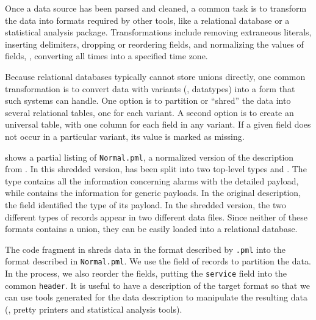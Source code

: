 Once a data source has been parsed and cleaned, a common task is to
transform the data into formats required by other tools, like a
relational database or a statistical analysis package.
Transformations include removing extraneous literals, inserting
delimiters, dropping or reordering fields, and normalizing the values
of fields, \eg{}, converting all times into a specified time zone.

Because relational databases typically cannot store unions directly,
one common transformation is to convert data with variants (\ie{},
datatypes) into a form that such systems can handle.  One option is to
partition or ``shred'' the data into several relational tables, one
for each variant.  A second option is to create an universal table,
with one column for each field in any variant.  If a given field does
not occur in a particular variant, its value is marked as missing.

 shows a partial listing of
\texttt{\darkstar{}Normal.pml}, a normalized version of the
\darkstar{} description from . In this
shredded version,  has been split into two top-level types
 and .  The type  contains all
the information concerning alarms with the detailed payload, while
 contains the information for generic payloads.  In the
original description, the  field identified the type of its
payload.  In the shredded version, the two different types of records
appear in two different data files. Since neither of these formats
contains a union, they can be easily loaded into a relational
database.

The code fragment in  shreds \darkstar{}
data in the format described by \texttt{\darkstar{}.pml} into the
format described in \texttt{\darkstar{}Normal.pml}.  We use the
 field of  records to partition the data. In the
process, we also reorder the fields, putting the \texttt{service}
field into the common \texttt{header}.  It is useful to have a
\padsml{} description of the target format so that we can use tools
generated for the data description to manipulate the resulting data
(\eg{}, pretty printers and statistical analysis tools).

